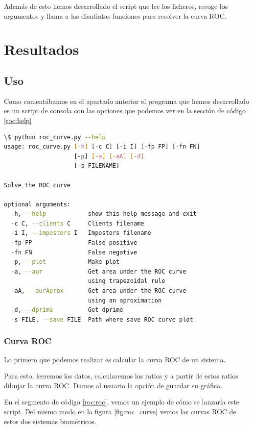 Además de esto hemos desarrollado el script que lee los ficheros, recoge los argumentos y llama a las disntintas funciones para resolver la curva ROC. 


\section{Resultados}

\subsection{Uso}
Como comentábamos en el apartado anterior el programa que hemos desarrollado es un script de consola con las opciones que podemos ver en la sección de código \ref{roc:help}

\begin{lstlisting}[language=bash,label=roc:help,caption=Uso del script para calcular la curva ROC]
\$ python roc_curve.py --help
usage: roc_curve.py [-h] [-c C] [-i I] [-fp FP] [-fn FN] 
                    [-p] [-a] [-aA] [-d]
                    [-s FILENAME]

Solve the ROC curve

optional arguments:
  -h, --help            show this help message and exit
  -c C, --clients C     Clients filename
  -i I, --impostors I   Impostors filename
  -fp FP                False positive
  -fn FN                False negative
  -p, --plot            Make plot
  -a, --aur             Get area under the ROC curve 
                        using trapezoidal rule
  -aA, --aurAprox       Get area under the ROC curve 
                        using an aproximation
  -d, --dprime          Get dprime
  -s FILE, --save FILE  Path where save ROC curve plot
\end{lstlisting}

\subsubsection{Curva ROC}
Lo primero que podemos realizar es calcular la curva ROC de un sistema.\par
Para esto, leeremos los datos, calcularemos los ratios y a partir de estos ratios dibujar la curva ROC. Damos al usuario la opción de guardar su gráfica. \par
En el segmento de código \ref{roc:roc}, vemos un ejemplo de cómo se lanzaría este script. Del mismo modo en la figura \ref{fig:roc_curve} vemos las curvas ROC de estos dos sistemas biométricos.\par


